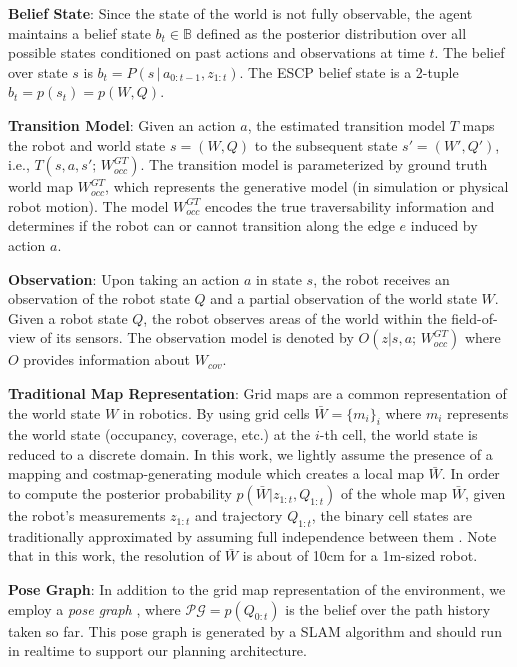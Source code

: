 \documentclass[letterpaper]{article} %
\newcommand{\ph}[1]{{\textbf{#1}:}} %
\begin{document}
\ph{Belief State} Since the state of the world is not fully observable, the agent maintains a belief state $b_t\in \mathbb{B}$ defined as the posterior distribution over all possible states conditioned on past actions and observations at time $t$. The belief over state $s$ is $b_{t} = P(s \,|\, a_{0:t-1}, z_{1:t})$. The ESCP belief state is a 2-tuple $b_t = p(s_t) = p(W,Q)$.

\ph{Transition Model} Given an action $a$, the estimated transition model $T$ maps the robot and world state $s = (W, Q)$ to the subsequent state $s' = (W', Q')$, i.e., $T(s, a, s'; \, W_{occ}^{GT})$. 
The transition model is parameterized by ground truth world map $W_{occ}^{GT}$, which represents the generative model (in simulation or physical robot motion). %
The model $W_{occ}^{GT}$ encodes the true traversability information and determines if the robot can or cannot transition along the edge $e$ induced by action $a$.%

\ph{Observation} Upon taking an action $a$ in state $s$, the robot receives an observation of the robot state $Q$ and a partial observation of the world state $W$. Given a robot state $Q$, the robot observes areas of the world within the field-of-view of its sensors.  The observation model is denoted by $  O(z | s, a; \, W_{occ}^{GT})$
where $O$ provides information about $W_{cov}$.%

\ph{Traditional Map Representation} Grid maps are a common representation of the world state $W$ in robotics. %
By using grid cells $\bar{W}=\{m_i\}_i$ where $m_i$ represents the world state (occupancy, coverage, etc.) at the $i$-th cell, the world state is reduced to a discrete domain.  In this work, we lightly assume the presence of a mapping and costmap-generating module which creates a local map $\bar{W}$.  
In order to compute the posterior probability $p(\bar{W} | z_{1:t}, Q_{1:t})$ of the whole map $\bar{W}$, given the robot's measurements $z_{1:t}$ and trajectory $Q_{1:t}$, the binary cell states are traditionally approximated by assuming full independence between them \cite{TBF05,elfes1990stochastic}. Note that in this work, the resolution of $\bar{W}$ is about of 10cm for a 1m-sized robot.

\ph{Pose Graph} In addition to the grid map representation of the environment, we employ a \textit{pose graph} \cite{thrun2002probabilistic}, where $\mathcal{PG} = p(Q_{0:t})$ is the belief over the path history taken so far.  This pose graph is generated by a SLAM algorithm and should run in realtime to support our planning architecture.  %
\end{document}
